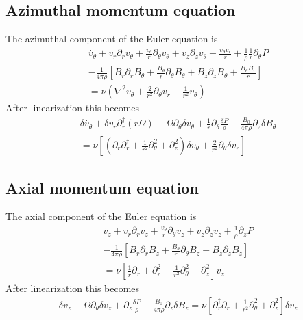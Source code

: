\documentclass[letterpaper]{article}
\begin{document}
\subsection{Azimuthal momentum equation}
The azimuthal component of the Euler equation is
\begin{align}
\dot{v_\theta} + v_r \partial_r v_\theta
 + \frac{v_\theta}{r}\partial_\theta v_\theta + v_z \partial_z v_\theta
 + \frac{v_\theta v_r}{r} + \frac{1}{\rho}\frac{1}{r}\partial_\theta P 
\nonumber \\
-\frac{1}{4\pi\rho}\left[B_r\partial_r B_\theta
 + \frac{B_\theta}{r}\partial_\theta B_\theta + B_z \partial_z B_\theta
 + \frac{B_\theta B_r}{r}\right]
\nonumber \\
= \nu\left(\nabla^2 v_\theta + \frac{2}{r^2}\partial_\theta v_r
 - \frac{1}{r^2}v_\theta \right)
\end{align}
After linearization this becomes
\begin{align}
\delta \dot{v_\theta} + \delta v_r \partial_r^\dagger(r\Omega)
 + \Omega \partial_\theta \delta v_\theta
 + \frac{1}{r}\partial_\theta \frac{\delta P}{\rho}
 - \frac{B_0}{4\pi\rho} \partial_z \delta B_\theta
\nonumber \\
= \nu\left[\left(\partial_r \partial_r^\dagger
 + \frac{1}{r^2}\partial_\theta^2 + \partial_z^2\right)\delta v_\theta
 + \frac{2}{r^2}\partial_\theta \delta v_r \right]
\end{align}

\subsection{Axial momentum equation}
The axial component of the Euler equation is
\begin{align}
\dot{v_z} + v_r \partial_r v_z + \frac{v_\theta}{r}\partial_\theta v_z
 + v_z \partial_z v_z + \frac{1}{\rho}\partial_z P
\nonumber \\
-\frac{1}{4\pi\rho}\left[B_r\partial_r B_z
 + \frac{B_\theta}{r}\partial_\theta B_z + B_z \partial_z B_z \right]
\nonumber \\
=\nu\left[\frac{1}{r}\partial_r + \partial_r^2
 + \frac{1}{r^2}\partial_\theta^2 + \partial_z^2\right]v_z
\end{align}
After linearization this becomes
\begin{align}
\delta\dot{v_z} + \Omega \partial_\theta \delta v_z
 + \partial_z \frac{\delta P}{\rho} 
 - \frac{B_0}{4\pi\rho} \partial_z \delta B_z
 = \nu\left[\partial_r^\dagger \partial_r + \frac{1}{r^2}\partial_\theta^2
 + \partial_z^2\right]\delta v_z
\end{align}
\end{document}
